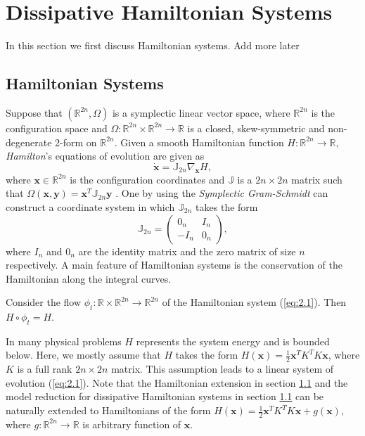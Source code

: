 \section{Dissipative Hamiltonian Systems} \label{sec:2}
In this section we first discuss Hamiltonian systems. Add more later

\subsection{Hamiltonian Systems} Suppose that $(\mathbb{R}^{2n},\Omega)$ is a symplectic linear vector space, where $\mathbb{R}^{2n}$ is the configuration space and $\Omega:\mathbb{R}^{2n}\times \mathbb{R}^{2n} \to \mathbb R$ is a closed, skew-symmetric and non-degenerate 2-form on $\mathbb{R}^{2n}$. Given a smooth Hamiltonian function $H:\mathbb{R}^{2n}\to \mathbb R$, \emph{Hamilton}'s equations of evolution are given as
\begin{equation} \label{eq:2.1}
	\dot {\mathbf x} = \mathbb J_{2n} \nabla_{\mathbf x} H,
\end{equation}
where $\mathbf x\in\mathbb R^{2n}$ is the configuration coordinates and $\mathbb J$ is a $2n\times 2n$ matrix such that $\Omega(\mathbf x,\mathbf y) = \mathbf x^T \mathbb J_{2n} \mathbf y$ \cite{Marsden:2010:IMS:1965128}. One by using the \emph{Symplectic Gram-Schmidt} \cite{de2006symplectic} can construct a coordinate system in which $\mathbb J_{2n}$ takes the form
\begin{equation} \label{eq:2.2}
	\mathbb{J}_{2n} = 
	\begin{pmatrix}
		0_n & I_n \\
		-I_n & 0_n
	\end{pmatrix},
\end{equation}
where $I_n$ and $0_n$ are the identity matrix and the zero matrix of size $n$ respectively. A main feature of Hamiltonian systems is the conservation of the Hamiltonian along the integral curves.
\begin{theorem} \label{theorem:2.1}
\cite{Marsden:2010:IMS:1965128} Consider the flow $\phi_t:\mathbb R\times \mathbb R^{2n} \to \mathbb R^{2n}$ of the Hamiltonian system (\ref{eq:2.1}). Then $H\circ \phi_t = H$.
\end{theorem}

In many physical problems $H$ represents the system energy and is bounded below. Here, we mostly assume that $H$ takes the form $H(\mathbf x) = \frac 1 2 \mathbf x^T K^T K \mathbf x$, where $K$ is a full rank $2n\times 2n$ matrix. This assumption leads to a linear system of evolution (\ref{eq:2.1}). Note that the Hamiltonian extension in section \ref{} and the model reduction for dissipative Hamiltonian systems in section \ref{} can be naturally extended to Hamiltonians of the form $H(\mathbf x) = \frac 1 2 \mathbf x^T K^T K \mathbf x + g(\mathbf x)$, where $g:\mathbb R^{2n} \to \mathbb R$ is arbitrary function of $\mathbf x$. 

